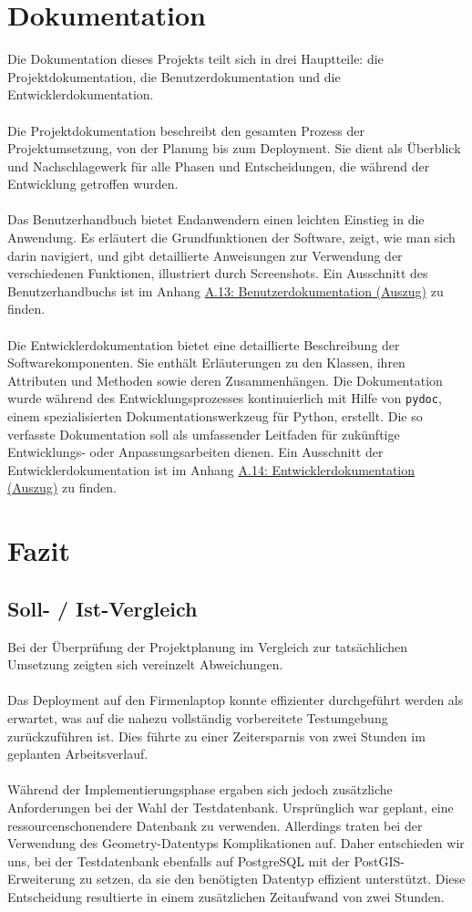 \documentclass[a4paper,12pt]{article}
\begin{document}
\section{Dokumentation}
Die Dokumentation dieses Projekts teilt sich in drei Hauptteile: die Projektdokumentation, die Benutzerdokumentation und die Entwicklerdokumentation.\\
\\
Die Projektdokumentation beschreibt den gesamten Prozess der Projektumsetzung, von der Planung bis zum Deployment. Sie dient als Überblick und Nachschlagewerk für alle Phasen und Entscheidungen, die während der Entwicklung getroffen wurden.\\
\\
Das Benutzerhandbuch bietet Endanwendern einen leichten Einstieg in die Anwendung. Es erläutert die Grundfunktionen der Software, zeigt, wie man sich darin navigiert, und gibt detaillierte Anweisungen zur Verwendung der verschiedenen Funktionen, illustriert durch Screenshots. Ein Ausschnitt des Benutzerhandbuchs ist im Anhang \hyperref[sec:benutzerdokumentation]{A.13: Benutzerdokumentation (Auszug)} zu finden.\\
\\
Die Entwicklerdokumentation bietet eine detaillierte Beschreibung der Softwarekomponenten. Sie enthält Erläuterungen zu den Klassen, ihren Attributen und Methoden sowie deren Zusammenhängen. Die Dokumentation wurde während des Entwicklungsprozesses kontinuierlich mit Hilfe von \texttt{pydoc}, einem spezialisierten Dokumentationswerkzeug für Python, erstellt. Die so verfasste Dokumentation soll als umfassender Leitfaden für zukünftige Entwicklungs- oder Anpassungsarbeiten dienen. Ein Ausschnitt der Entwicklerdokumentation ist im Anhang \hyperref[sec:entwicklerdokumentation]{A.14: Entwicklerdokumentation (Auszug)} zu finden.

\section{Fazit}
\subsection{Soll- / Ist-Vergleich}
Bei der Überprüfung der Projektplanung im Vergleich zur tatsächlichen Umsetzung zeigten sich vereinzelt Abweichungen.\\
\\
Das Deployment auf den Firmenlaptop konnte effizienter durchgeführt werden als erwartet, was auf die nahezu vollständig vorbereitete Testumgebung zurückzuführen ist. Dies führte zu einer Zeitersparnis von zwei Stunden im geplanten Arbeitsverlauf.\\
\\
Während der Implementierungsphase ergaben sich jedoch zusätzliche Anforderungen bei der Wahl der Testdatenbank. Ursprünglich war geplant, eine ressourcenschonendere Datenbank zu verwenden. Allerdings traten bei der Verwendung des Geometry-Datentyps Komplikationen auf. Daher entschieden wir uns, bei der Testdatenbank ebenfalls auf PostgreSQL mit der PostGIS-Erweiterung zu setzen, da sie den benötigten Datentyp effizient unterstützt. Diese Entscheidung resultierte in einem zusätzlichen Zeitaufwand von zwei Stunden.
\end{document}
